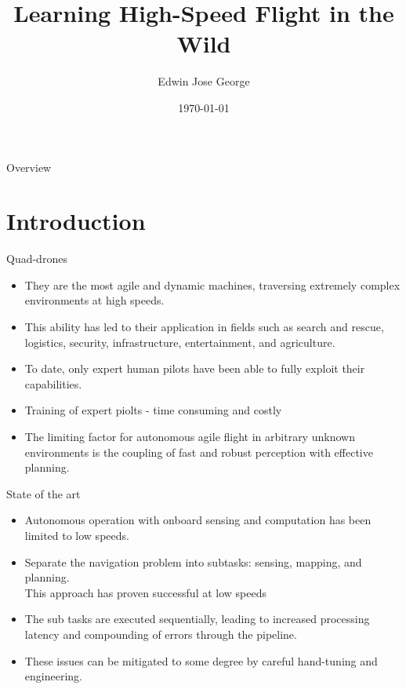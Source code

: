 \documentclass{beamer}
\title[High speed Flight]{Learning High-Speed Flight in the Wild \autocite{high-speed-flight}}
\author{Edwin Jose George}
\institute[GCEK]{
	Guided by Dr. Rafeeque P C \\
	\medskip
	Department of Computer Science and Engineering \\
	Government College of Engineering Kannur
}
\date{\today}
\begin{document}
\begin{frame}
	\titlepage
\end{frame}

\begin{frame}{Overview}
	\tableofcontents
\end{frame}

\section{Introduction}
\begin{frame}{Quad-drones}
	\begin{itemize}
		\item They are the most agile and dynamic machines, traversing extremely complex environments at high speeds. 
		\item This ability has led to their application in fields such as search and rescue, logistics, security, infrastructure, entertainment, and agriculture.
		\item To date, only expert human pilots have been able to fully exploit their capabilities. 
		\item Training of expert piolts - time consuming and costly
		\item The limiting factor for autonomous agile flight in arbitrary unknown environments is the coupling of fast and robust perception with effective planning. 
	\end{itemize}
\end{frame}

\begin{frame}{State of the art}
	\begin{itemize}
		\item Autonomous operation with onboard sensing and computation has been limited to low speeds. 
		\item Separate the navigation problem into subtasks: sensing, mapping, and planning. \\
		This approach has proven successful at low speeds
		\item The sub tasks are executed sequentially, leading to increased processing latency and compounding of errors through the pipeline.
		\item These issues can be mitigated to some degree by careful hand-tuning and engineering.
	\end{itemize}
\end{frame}
\end{document}

